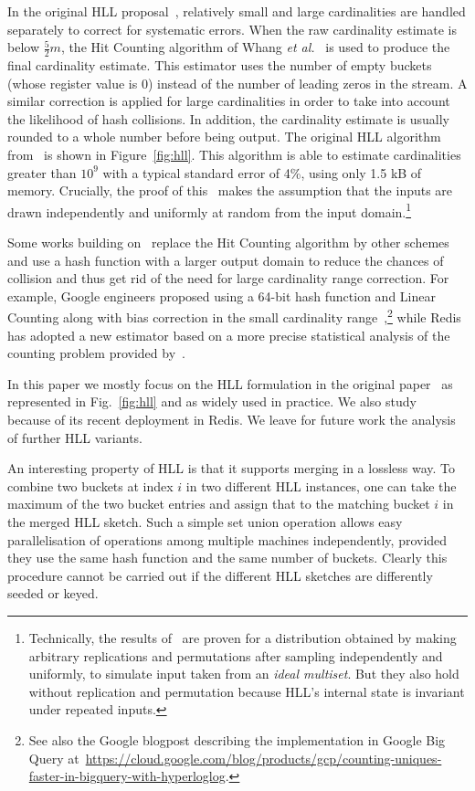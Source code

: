 \documentclass[sigconf, anonymous, dvipsnames]{acmart} %
\begin{document}
In the original HLL proposal~\cite{hll}, relatively small and large cardinalities are handled separately to correct for systematic errors. When the raw cardinality estimate is below $\frac{5}{2}m$, the Hit Counting algorithm of Whang \emph{et al.}~\cite{hitcounting} is used to produce the final cardinality estimate. This estimator uses the number of empty buckets (whose register value is 0) instead of the number of leading zeros in the stream. A similar correction is applied for large cardinalities in order to take into account the likelihood of hash collisions. In addition, the cardinality estimate is usually rounded to a whole number before being output. The original HLL algorithm from~\cite{hll} is shown in Figure~\ref{fig:hll}. This algorithm is able to estimate cardinalities greater than $10^9$ with a typical standard error of 4\%, using only 1.5 kB of memory. Crucially, the proof of this~\cite[Theorem 1]{hll} makes the assumption that the inputs are drawn independently and uniformly at random from the input domain.\footnote{Technically, the results of~\cite{hll} are proven for a distribution obtained by making arbitrary replications and permutations after sampling independently and uniformly, to simulate input taken from an \emph{ideal multiset}. But they also hold without replication and permutation because HLL's internal state is invariant under repeated inputs.}

Some works building on~\cite{hll} replace the Hit Counting algorithm by other schemes and use a hash function with a larger output domain to reduce the chances of collision and thus get rid of the need for large cardinality range correction. For example, Google engineers proposed using a 64-bit hash function and Linear Counting along with bias correction in the small cardinality range~\cite{hllpractice},\footnote{See also the Google blogpost describing the implementation in Google Big Query at~\url{https://cloud.google.com/blog/products/gcp/counting-uniques-faster-in-bigquery-with-hyperloglog}.} while Redis has adopted a new estimator based on a more precise statistical analysis of the counting problem provided by~\cite{hllnew}. 

In this paper we mostly focus on the HLL formulation in the original paper~\cite{hll} as represented in Fig.~\ref{fig:hll} and as widely used in practice. We also study~\cite{hllnew} because of its recent deployment in Redis.  We leave for future work the analysis of further HLL variants. %

An interesting property of HLL is that it supports merging in a lossless way. To combine two buckets at index $i$ in two different HLL instances, one can take the maximum of the two bucket entries and assign that to the matching bucket $i$ in the merged HLL sketch. Such a simple set union operation allows easy parallelisation of operations among multiple machines independently, provided they use the same hash function and the same number of buckets. Clearly this procedure cannot be carried out if the different HLL sketches are differently seeded or keyed.
\end{document}
